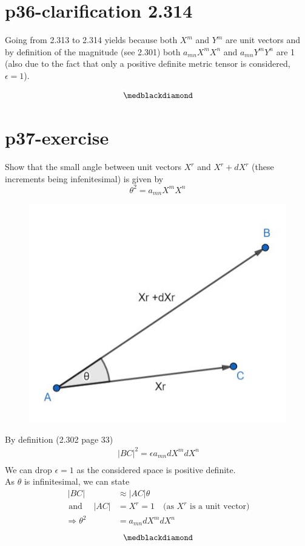 \section{p36-clarification 2.314}
\begin{tcolorbox}
Going from 2.313 to 2.314 yields because both $X^m$ and $Y^m$ are unit vectors and by definition of the magnitude (see 2.301) both  $a_{mn}X^mX^n$ and $a_{mn}Y^mY^n$ are 1 (also due to the fact that only a positive definite metric tensor is considered, $\epsilon = 1$).
\end{tcolorbox}
$$\medblackdiamond$$
\newpage

\section{p37-exercise}

\begin{tcolorbox}
Show that the small angle between unit vectors $X^r$ and $X^r + dX^r$ (these increments being infenitesimal) is given by $$ \theta^2 = a_{mn}X^mX^n$$
\end{tcolorbox}
\begin{figure}[htp] 
    \centering
\includegraphics[scale=.5]{Exp37_1.jpg}
\end{figure}
By definition (2.302 page 33)
\begin{align} 
\ |BC|^2 =\epsilon a_{mn}dX^mdX^n\\
\end{align}
We can drop $\epsilon = 1$ as the considered space is positive definite.\\
As $\theta$ is infinitesimal, we can state
\begin{align}
\ |BC| &\approx |AC|\theta\\
\text{ and } \quad |AC| &= X^r = 1\quad  \text{(as } X^r \text{ is a unit vector)}\\
\Rightarrow \theta^2 &= a_{mn}dX^mdX^n
\end{align}
$$\medblackdiamond$$
\newpage


